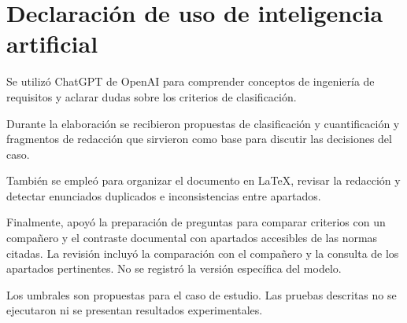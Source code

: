 \documentclass[11pt,a4paper]{article}
\begin{document}
\printbibliography[heading=bibnumbered,title={Referencias}]


\clearpage
\section{Declaración de uso de inteligencia artificial}

Se utilizó ChatGPT de OpenAI para comprender
conceptos de ingeniería de requisitos y aclarar
dudas sobre los criterios de clasificación.

Durante la elaboración se recibieron propuestas
de clasificación y cuantificación y fragmentos
de redacción que sirvieron como base para
discutir las decisiones del caso.

También se empleó para organizar el documento
en LaTeX, revisar la redacción y detectar
enunciados duplicados e inconsistencias
entre apartados.

Finalmente, apoyó la preparación de preguntas
para comparar criterios con un compañero
y el contraste documental con apartados
accesibles de las normas citadas. La revisión
incluyó la comparación con el compañero
y la consulta de los apartados pertinentes.
No se registró la versión específica del modelo.

Los umbrales son propuestas para el caso
de estudio. Las pruebas descritas no se
ejecutaron ni se presentan resultados
experimentales.
\end{document}

